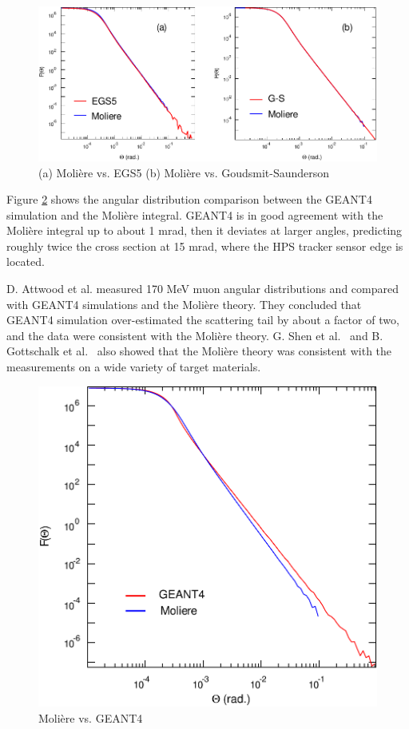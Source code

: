 \begin{figure}[ht]
\includegraphics[height=3 in]{appendix/appendix_1-eps-converted-to.pdf}
\caption{\small{ (a) Moli\`{e}re vs. EGS5 \hspace{1 cm} (b) Moli\`{e}re vs. Goudsmit-Saunderson}}
\label{appendix:1}
\end{figure}

Figure \ref{appendix:2} shows the angular distribution comparison between the GEANT4 
simulation and the Moli\`{e}re integral. 
GEANT4 is in good agreement with the Moli\`{e}re integral up to about 1 mrad, then it 
deviates at larger angles, predicting roughly twice the cross section at 15 mrad, 
where the HPS tracker sensor edge is located.

D. Attwood et al. measured 170 MeV muon angular distributions and compared with 
GEANT4 simulations and the Moli\`{e}re theory. \cite{attwood} They concluded that GEANT4 
simulation over-estimated the scattering tail by about a factor of two, and the data were consistent
with the Moli\`{e}re theory. G. Shen et al.~ \cite{shen} and B. Gottschalk et al.~ \cite{gottschalk}
also showed that the Moli\`{e}re theory was consistent with the measurements on a wide variety of
target materials.

\begin{figure}[ht]
\includegraphics[height= 3 in]{appendix/appendix_2-eps-converted-to.pdf}
\caption{\small{ Moli\`{e}re vs. GEANT4 }}
\label{appendix:2}
\end{figure}

